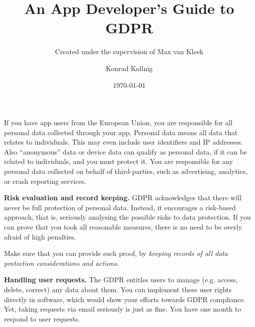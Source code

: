 \documentclass[
	12pt,
	a4paper,
	]{scrartcl}
\begin{document}
	\title{An App Developer's Guide to GDPR}
	\subtitle{Created under the supervision of Max van Kleek}
	\author{Konrad Kollnig}
	\date{\today}
	\maketitle
	
	If you have app users from the European Union, you are responsible for 
	all 
	personal data collected through your app.
	Personal data means all data that relates to individuals.
	This may even include user identifiers and IP addresses.
	Also \enquote{anonymous} data or device data can qualify as personal 
	data, 
	if it can be related to individuals,
	and you must protect it.
	You are responsible for any personal data collected on behalf of 
	third-parties, such as advertising, analytics, or crash reporting 
	services.
	
	\textbf{Risk evaluation and record keeping.}
	GDPR acknowledges that there will never be full protection of personal 
	data.
	Instead, it encourages a risk-based approach, that is, seriously 
	analysing 
	the possible risks to data protection.
	If you can prove that you took all reasonable measures, there is no 
	need 
	to be overly afraid of high penalties.
	
	Make sure that you can provide such proof, by \textit{keeping records 
	of 
	all data protection considerations and actions}.
	
	\textbf{Handling user requests.}
	The GDPR entitles users to manage (e.g. access, delete, correct) any 
	data 
	about them.
	You can implement these user rights directly in software, which would 
	show 
	your efforts towards GDPR compliance.
	Yet, taking requests via email seriously is just as fine.
	You have one month to respond to user requests.
	
\end{document}
